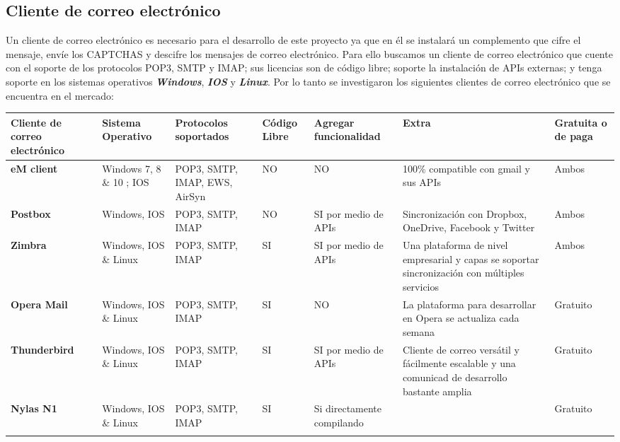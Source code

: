 \documentclass[12pt,oneside,onecolumn,openany]{report}
\begin{document}
\subsection{Cliente de correo electrónico}
Un cliente de correo electrónico es necesario para el desarrollo de este proyecto ya que en él se instalará un complemento que cifre el mensaje, envíe los CAPTCHAS y descifre los mensajes de correo electrónico. Para ello buscamos un cliente de correo electrónico que cuente con el soporte de los protocolos POP3, SMTP y IMAP; sus licencias son de código libre; soporte la instalación de APIs externas; y tenga soporte en los sistemas operativos \textbf{\textit{Windows}}, \textbf{\textit{IOS}} y \textbf{\textit{Linux}}. Por lo tanto se investigaron los siguientes clientes de correo electrónico que se encuentra en el mercado: \\
\begin{longtable}[H]{| p{} | p{2cm} |p{2cm}|p{}|p{2cm}|p{3cm}|p{2cm}|}%
 \hline
 \textbf{Cliente de correo electrónico}&\textbf{Sistema Operativo}&\textbf{Protocolos soportados}&\textbf{Código Libre}&\textbf{Agregar funcionalidad}&\textbf{Extra}&\textbf{Gratuita o de paga}\\
 \hline
 \textbf{eM client}&Windows 7, 8 \& 10 ; IOS&POP3, SMTP, IMAP, EWS, AirSyn&NO&NO&100\% compatible con gmail y sus APIs&Ambos\\
 \hline
 \textbf{Postbox}&Windows, IOS&POP3, SMTP, IMAP&NO&SI por medio de APIs&Sincronización con Dropbox, OneDrive, Facebook y Twitter&Ambos\\
 \hline
 \textbf{Zimbra}&Windows, IOS \& Linux&POP3, SMTP, IMAP&SI&SI por medio de APIs&Una plataforma de nivel empresarial y capas se soportar sincronización con múltiples servicios&Ambos\\
 \hline
 \textbf{Opera Mail}&Windows, IOS \& Linux&POP3, SMTP, IMAP&SI&NO&La plataforma para desarrollar en Opera se actualiza cada semana&Gratuito\\
 \hline
 \textbf{Thunderbird}&Windows, IOS \& Linux&POP3, SMTP, IMAP&SI&SI por medio de APIs&Cliente de correo versátil y fácilmente escalable y una comunicad de desarrollo bastante amplia&Gratuito\\
 \hline
 \textbf{Nylas N1}&Windows, IOS \& Linux&POP3, SMTP, IMAP&SI&Si directamente compilando& &Gratuito \\
 \hline
\label{tabla:Descripcion de clientes}
\end{longtable}
\end{document}
